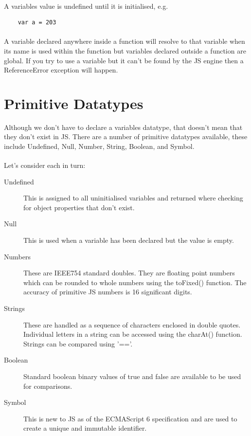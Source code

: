 \paragraph{} A variables value is undefined until it is initialised, e.g. 

\begin{lstlisting}
	var a = 203
\end{lstlisting}

\paragraph{} A variable declared anywhere inside a function will resolve to that variable when its name is used within the function but variables declared outside a function are global. If you try to use a variable but it can't be found by the JS engine then a ReferenceError exception will happen.


\section{Primitive Datatypes}
\paragraph{} Although we don't have to declare a variables datatype, that doesn't mean that they don't exist in JS. There are a number of primitive datatypes available, these include Undefined, Null, Number, String, Boolean, and Symbol.
\paragraph{} Let's consider each in turn:

\begin{description}
\item [Undefined] This is assigned to all uninitialised variables and returned where checking for object properties that don’t exist.
\item [Null] This is used when a variable has been declared but the value is empty.
\item [Numbers] These are IEEE754 standard doubles. They are floating point numbers which can be rounded to whole numbers using the toFixed() function. The accuracy of primitive JS numbers is 16 significant digits.
\item [Strings] These are handled as a sequence of characters enclosed in double quotes. Individual letters in a string can be accessed using the charAt() function. Strings can be compared using '=='.
\item [Boolean] Standard boolean binary values of true and false are available to be used for comparisons.
\item [Symbol] This is new to JS as of the ECMAScript 6 specification and are used to create a unique and immutable identifier.
\end{description}



